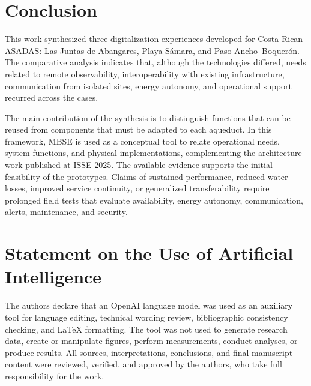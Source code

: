 \documentclass[conference]{IEEEtran}
\begin{document}
\section{Conclusion}

This work synthesized three digitalization experiences developed for Costa Rican ASADAS: Las Juntas de Abangares, Playa S\'{a}mara, and Paso Ancho--Boquer\'{o}n. The comparative analysis indicates that, although the technologies differed, needs related to remote observability, interoperability with existing infrastructure, communication from isolated sites, energy autonomy, and operational support recurred across the cases.

The main contribution of the synthesis is to distinguish functions that can be reused from components that must be adapted to each aqueduct. In this framework, MBSE is used as a conceptual tool to relate operational needs, system functions, and physical implementations, complementing the architecture work published at ISSE 2025. The available evidence supports the initial feasibility of the prototypes. Claims of sustained performance, reduced water losses, improved service continuity, or generalized transferability require prolonged field tests that evaluate availability, energy autonomy, communication, alerts, maintenance, and security.

\section*{Statement on the Use of Artificial Intelligence}

The authors declare that an OpenAI language model was used as an auxiliary tool for language editing, technical wording review, bibliographic consistency checking, and LaTeX formatting. The tool was not used to generate research data, create or manipulate figures, perform measurements, conduct analyses, or produce results. All sources, interpretations, conclusions, and final manuscript content were reviewed, verified, and approved by the authors, who take full responsibility for the work.
\end{document}
